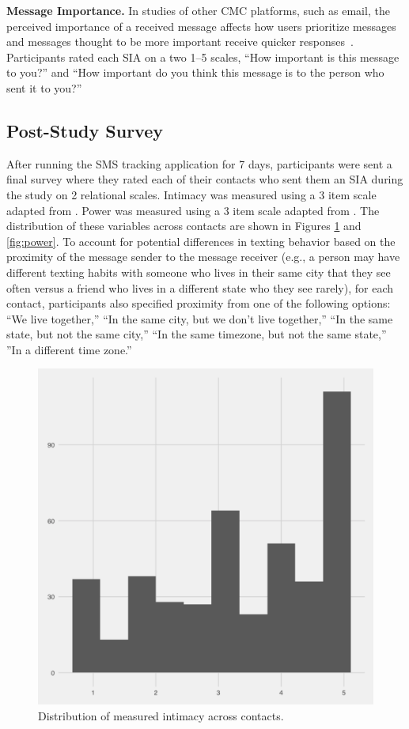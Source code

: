 \documentclass[12pt]{nuthesis}	%
\begin{document}
\textbf{Message Importance.} In studies of other CMC platforms, such as email, the perceived importance of a received message affects how users prioritize messages~\citep{siu2006going,tsugawa2012estimating} and messages thought to be more important receive quicker responses~\citep{dabbish2005understanding,wainer2011should}. Participants rated each SIA on a two 1--5 scales, ``How important is this message to you?'' and ``How important do you think this message is to the person who sent it to you?''


\subsection{Post-Study Survey}

After running the SMS tracking application for 7 days, participants were sent a final survey where they rated each of their contacts who sent them an SIA during the study on 2 relational scales. Intimacy was measured using a 3 item scale adapted from \citet{miller1982assessment}. Power was measured using a 3 item scale adapted from \citet{farrell2015relationship}. The distribution of these variables across contacts are shown in Figures \ref{fig:intimacy} and \ref{fig:power}. To account for potential differences in texting behavior based on the proximity of the message sender to the message receiver (e.g., a person may have different texting habits with someone who lives in their same city that they see often versus a friend who lives in a different state who they see rarely), for each contact, participants also specified proximity from one of the following options: ``We live together,'' ``In the same city, but we don't live together,'' ``In the same state, but not the same city,'' ``In the same timezone, but not the same state,'' ''In a different time zone.''


\begin{figure}[h]
\centering
\includegraphics[width=.7\textwidth]{figures/intimacy_distribution}
\caption{Distribution of measured intimacy across contacts.}
\label{fig:intimacy}
\end{figure}
\end{document}
